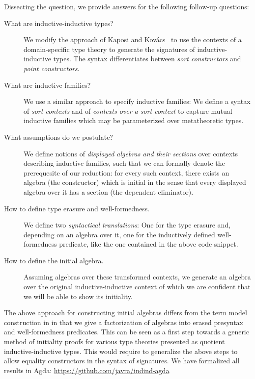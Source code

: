 \documentclass{easychair}
\begin{document}
\newpage

\noindent Dissecting the question, we provide answers for the following follow-up questions:

\begin{description}
\item[What are inductive-inductive types?]
We modify the approach of Kaposi and Kovács~\cite{qiit}
to use the contexts of a domain-specific type theory to generate the signatures
of inductive-inductive types. The syntax differentiates between \emph{sort
constructors} and \emph{point constructors}.
\item[What are inductive families?]
We use a similar approach to specify inductive families:
We define a syntax of \emph{sort contexts} and of \emph{contexts over a sort context}
to capture mutual inductive families which may be parameterized over metatheoretic
types.
\item[What assumptions do we postulate?]
We define notions of \emph{displayed algebras and their sections} over contexts
describing inductive families, such that we can formally denote the prerequesite
of our reduction:
for every such context, there exists an algebra (the constructor) which is initial
in the sense that every displayed algebra over it has a section (the dependent eliminator).
\item[How to define type erasure and well-formedness.]
We define two \emph{syntactical translations}: One for the type erasure and,
depending on an algebra over it, one for the inductively defined well-formedness
predicate, like the one contained in the above code snippet.
\item[How to define the initial algebra.]
Assuming algebras over these transformed contexts, we generate an algebra over
the original inductive-inductive context of which we are confident that we will
be able to show its initiality.
\end{description}

\noindent
The above approach for constructing initial algebras differs from the term model
construction in \cite{qiit} in that we give a factorization of algebras
into erased presyntax and well-formedness predicates. This can be seen as a
first step towards a generic method of initiality proofs for various type
theories presented as quotient inductive-inductive types. This would require to
generalize the above steps to allow equality constructors in the syntax of
signatures. We have formalized all results in Agda:
\url{https://github.com/javra/indind-agda}




\end{document}
